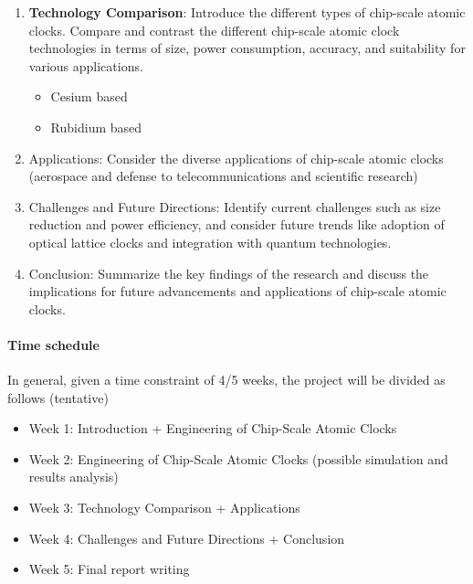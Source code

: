 \begin{enumerate}
    \item \textbf{Technology Comparison}: Introduce the different types of chip-scale atomic clocks. Compare and contrast the different chip-scale atomic clock technologies in terms of size, power consumption, accuracy, and suitability for various applications.
          \begin{itemize}
              \item Cesium based
              \item Rubidium based
          \end{itemize}
    \item Applications: Consider the diverse applications of chip-scale atomic clocks (aerospace and defense to telecommunications and scientific research)
    \item Challenges and Future Directions: Identify current challenges such as size reduction and power efficiency, and consider future trends like adoption of optical lattice clocks and integration with quantum technologies.
    \item Conclusion: Summarize the key findings of the research and discuss the implications for future advancements and applications of chip-scale atomic clocks.
\end{enumerate}


\paragraph{Time schedule}
In general, given a time constraint of 4/5 weeks, the project will be divided as follows (tentative)

\begin{itemize}
    \item Week 1: Introduction + Engineering of Chip-Scale Atomic Clocks
    \item Week 2: Engineering of Chip-Scale Atomic Clocks (possible simulation and results analysis)
    \item Week 3: Technology Comparison + Applications
    \item Week 4: Challenges and Future Directions + Conclusion
    \item Week 5: Final report writing
\end{itemize}
